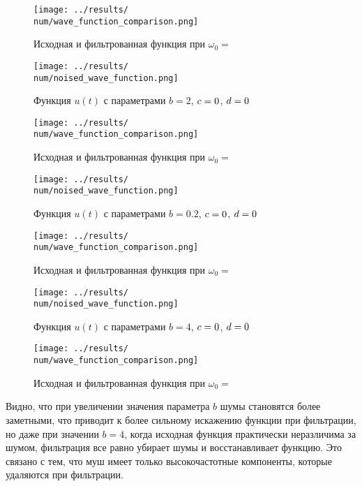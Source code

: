 \begin{figure}[ht!]
    \centering
    \texttt{[image: ../results/\\num/wave\_function\_comparison.png]}
    \caption{Исходная и фильтрованная функция при $\omega_0=$~\imageclip}
    \label{fig:wave_function_comparison_\num}
\end{figure}


\def\num{6}
\def\b{2}

\begin{figure}[ht!]
    \centering
    \texttt{[image: ../results/\\num/noised\_wave\_function.png]}
    \caption{Функция $u(t)$ с параметрами $b = \b$, $c = 0$, $d = 0$}
    \label{fig:noised_wave_function_\num}
\end{figure}

\begin{figure}[ht!]
    \centering
    \texttt{[image: ../results/\\num/wave\_function\_comparison.png]}
    \caption{Исходная и фильтрованная функция при $\omega_0=$~\imageclip}
    \label{fig:wave_function_comparison_\num}
\end{figure}


\def\num{7}
\def\b{0.2}

\begin{figure}[ht!]
    \centering
    \texttt{[image: ../results/\\num/noised\_wave\_function.png]}
    \caption{Функция $u(t)$ с параметрами $b = \b$, $c = 0$, $d = 0$}
    \label{fig:noised_wave_function_\num}
\end{figure}

\begin{figure}[ht!]
    \centering
    \texttt{[image: ../results/\\num/wave\_function\_comparison.png]}
    \caption{Исходная и фильтрованная функция при $\omega_0=$~\imageclip}
    \label{fig:wave_function_comparison_\num}
\end{figure}

\def\num{8}
\def\b{4}

\begin{figure}[ht!]
    \centering
    \texttt{[image: ../results/\\num/noised\_wave\_function.png]}
    \caption{Функция $u(t)$ с параметрами $b = \b$, $c = 0$, $d = 0$}
    \label{fig:noised_wave_function_\num}
\end{figure}

\begin{figure}[ht!]
    \centering
    \texttt{[image: ../results/\\num/wave\_function\_comparison.png]}
    \caption{Исходная и фильтрованная функция при $\omega_0=$~\imageclip}
    \label{fig:wave_function_comparison_\num}
\end{figure}

Видно, что при увеличении значения параметра $b$ шумы становятся более 
заметными, что приводит к более сильному искажению функции при фильтрации,
но даже при значении $b = 4$, когда исходная функция практически неразличима за шумом,
фильтрация все равно убирает шумы и восстанавливает функцию. Это связано с тем, что муш имеет 
только высокочастотные компоненты, которые удаляются при фильтрации.
